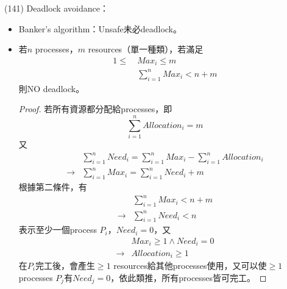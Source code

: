 \begin{theorem}{(141)} Deadlock avoidance：\begin{itemize}
        \item Banker's algorithm：Unsafe未必deadlock。
        \item 若$n$ processes，$m$ resources（單一種類），若滿足\begin{equation} \label{eq:deadlock}
            \begin{aligned}
                1 \le \ & Max_i \le m \\
                & \sum_{i = 1}^{n} Max_i < n + m
            \end{aligned}
        \end{equation} 則NO deadlock。\\ \begin{proof}
            若所有資源都分配給processes，即\begin{equation}
                \sum_{i = 1}^{n} Allocation_i = m
            \end{equation} 又\begin{equation}
                \begin{aligned}
                    & \sum_{i = 1}^{n} Need_i = \sum_{i = 1}^{n} Max_i - \sum_{i = 1}^{n} Allocation_i \\
                    \rightarrow & \sum_{i = 1}^{n} Max_i = \sum_{i = 1}^{n} Need_i + m
                \end{aligned}
            \end{equation}
            根據第二條件，有\begin{equation}
                \begin{aligned}
                    & \sum_{i = 1}^{n} Max_i < n + m \\
                    \rightarrow & \sum_{i = 1}^{n} Need_i < n
                \end{aligned}
            \end{equation}表示至少一個process $P_i$，$Need_i = 0$，又\begin{equation}
                \begin{aligned}
                    & Max_i \ge 1 \land Need_i = 0 \\
                    \rightarrow & Allocation_i \ge 1
                \end{aligned}
            \end{equation}在$P_i$完工後，會產生$\ge 1$ resources給其他processes使用，又可以使$\ge 1$ processes $P_j$有$Need_j = 0$，依此類推，所有processes皆可完工。
        \end{proof}
    \end{itemize}
\end{theorem}

